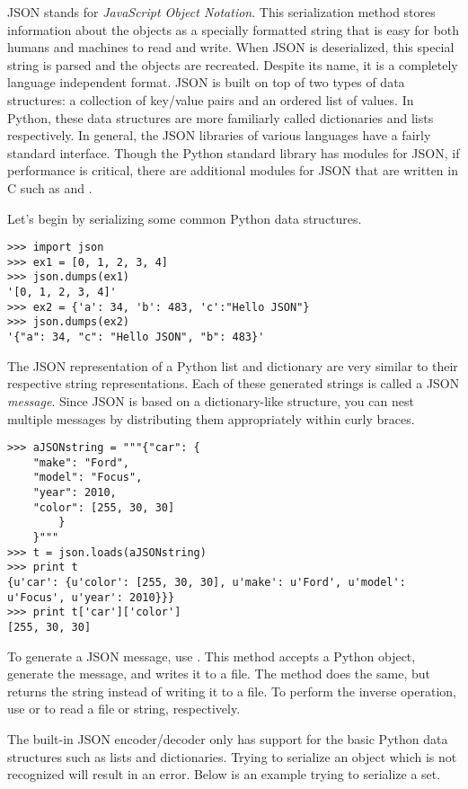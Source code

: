 JSON stands for \emph{JavaScript Object Notation}.
This serialization method stores information about the objects as a specially formatted string that is easy for both humans and machines to read and write.
When JSON is deserialized, this special string is parsed and the objects are recreated.
Despite its name, it is a completely language independent format.
JSON is built on top of two types of data structures: a collection of key/value pairs and an ordered list of values.
In Python, these data structures are more familiarly called dictionaries and lists respectively.
In general, the JSON libraries of various languages have a fairly standard interface.
Though the Python standard library has modules for JSON, if performance is critical, there are additional modules for JSON that are written in C such as  and .

Let's begin by serializing some common Python data structures.
\begin{lstlisting}
>>> import json
>>> ex1 = [0, 1, 2, 3, 4]
>>> json.dumps(ex1)
'[0, 1, 2, 3, 4]'
>>> ex2 = {'a': 34, 'b': 483, 'c':"Hello JSON"}
>>> json.dumps(ex2)
'{"a": 34, "c": "Hello JSON", "b": 483}'
\end{lstlisting}

The JSON representation of a Python list and dictionary are very similar to their respective string representations.
Each of these generated strings is called a JSON \emph{message}.
Since JSON is based on a dictionary-like structure, you can nest multiple messages by distributing them appropriately within curly braces.

\begin{lstlisting}
>>> aJSONstring = """{"car": {
    "make": "Ford",
    "model": "Focus",
    "year": 2010,
    "color": [255, 30, 30]
        }
    }"""
>>> t = json.loads(aJSONstring)
>>> print t
{u'car': {u'color': [255, 30, 30], u'make': u'Ford', u'model': u'Focus', u'year': 2010}}}
>>> print t['car']['color']
[255, 30, 30]
\end{lstlisting}

To generate a JSON message, use .
This method accepts a Python object, generate the message, and writes it to a file.
The method  does the same, but returns the string instead of writing it to a file.
To perform the inverse operation, use  or  to read a file or string, respectively.

The built-in JSON encoder/decoder only has support for the basic Python data structures such as lists and dictionaries.
Trying to serialize an object which is not recognized will result in an error. Below is an example trying to serialize a set.

